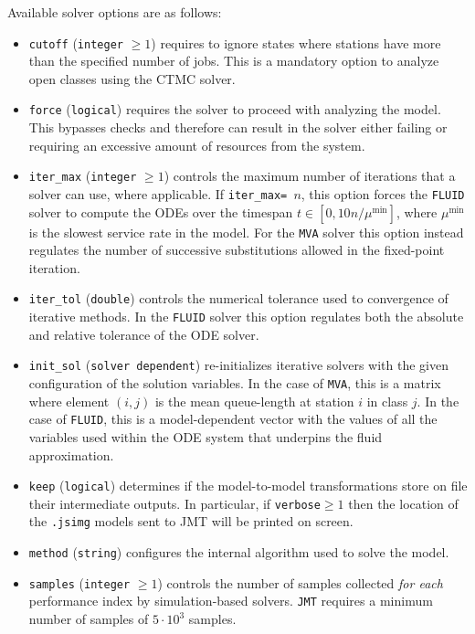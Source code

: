 Available solver options are as follows:
\begin{itemize}
\item \texttt{cutoff} (\texttt{integer} $\geq 1$) requires to ignore states where stations have more than the specified number of jobs. This is a mandatory option to analyze open classes using the CTMC solver.
\item \texttt{force} (\texttt{logical}) requires the solver to proceed with analyzing the model. This bypasses checks and therefore can result in the solver either failing or requiring an excessive amount of resources from the system.

\item \texttt{iter\_max} (\texttt{integer} $\geq 1$) controls the maximum number of iterations that a solver can use, where applicable. If  \texttt{iter\_max= }$n$, this option forces the \texttt{FLUID} solver to compute the ODEs over the timespan $t\in[0,10n/\mu^{\min}]$, where $\mu^{\min}$ is the slowest service rate in the model. For the \texttt{MVA} solver this option instead regulates the number of successive substitutions allowed in the fixed-point iteration.

\item \texttt{iter\_tol} (\texttt{double}) controls the numerical tolerance used to convergence of iterative methods. In the \texttt{FLUID} solver this option regulates both the absolute and relative tolerance of the ODE solver.

\item \texttt{init\_sol} (\texttt{solver dependent}) re-initializes iterative solvers with the given configuration of the solution variables. In the case of \texttt{MVA}, this is a matrix where element $(i,j)$ is the mean queue-length at station $i$ in class $j$. In the case of \texttt{FLUID}, this is a model-dependent vector with the values of all the variables used within the ODE system that underpins the fluid approximation.

\item \texttt{keep} (\texttt{logical}) determines if the model-to-model transformations store on file their intermediate outputs. In particular, if \texttt{verbose}$\geq 1$ then the location of the \texttt{.jsimg} models sent to JMT will be printed on screen.

\item \texttt{method} (\texttt{string}) configures the internal algorithm used to solve the model.

\item \texttt{samples} (\texttt{integer} $\geq 1$) controls the number of samples collected {\em for each} performance index by simulation-based solvers. \texttt{JMT} requires a minimum number of samples of $5\cdot 10^3$ samples.


\end{itemize}
